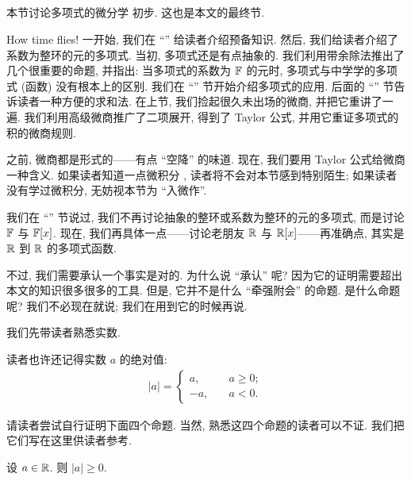 \subsection*{\IntroductionToDifferentialCalculusOnPolynomials}
\markright{\IntroductionToDifferentialCalculusOnPolynomials}

本节讨论多项式的微分学  初步. 这也是本文的最终节.

How time flies! 一开始, 我们在 ``\Prerequisites '' 给读者介绍预备知识. 然后, 我们给读者介绍了系数为整环的元的多项式. 当初, 多项式还是有点抽象的. 我们利用带余除法推出了几个很重要的命题, 并指出: 当多项式的系数为 $\mathbb{F}$ 的元时, 多项式与中学学的多项式 (函数) 没有根本上的区别. 我们在 ``\Interpolation '' 节开始介绍多项式的应用. 后面的 ``\SummationFormulae '' 节告诉读者一种方便的求和法. 在上节, 我们捡起很久未出场的微商, 并把它重讲了一遍. 我们利用高级微商推广了二项展开, 得到了 Taylor 公式, 并用它重证多项式的积的微商规则.

之前, 微商都是形式的——有点 ``空降'' 的味道. 现在, 我们要用 Taylor 公式给微商一种含义. 如果读者知道一点微积分 , 读者将不会对本节感到特别陌生; 如果读者没有学过微积分, 无妨视本节为 ``入微作''.

我们在 ``\PolynomialsOverF '' 节说过, 我们不再讨论抽象的整环或系数为整环的元的多项式, 而是讨论 $\mathbb{F}$ 与 $\mathbb{F}[x]$. 现在, 我们再具体一点——讨论老朋友 $\mathbb{R}$ 与 $\mathbb{R}[x]$——再准确点, 其实是 $\mathbb{R}$ 到 $\mathbb{R}$ 的多项式函数.

不过, 我们需要承认一个事实是对的. 为什么说 ``承认'' 呢? 因为它的证明需要超出本文的知识很多很多的工具. 但是, 它并不是什么 ``牵强附会'' 的命题. 是什么命题呢? 我们不必现在就说; 我们在用到它的时候再说.

我们先带读者熟悉实数.

读者也许还记得实数 $a$ 的绝对值:
\begin{align*}
    |a| = \begin{cases}
        a,  & \quad a \geq 0; \\
        -a, & \quad a < 0.
    \end{cases}
\end{align*}

请读者尝试自行证明下面四个命题. 当然, 熟悉这四个命题的读者可以不证. 我们把它们写在这里供读者参考.

\begin{proposition}
    设 $a \in \mathbb{R}$. 则 $|a| \geq 0$.
\end{proposition}

